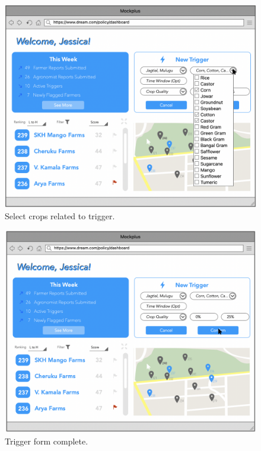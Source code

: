 \begin{figure}[H]
\centering
\includegraphics[scale=0.4]{../images_diagrams/mock_ups/dd/Trig04_Crops.png}
\caption{\label{fig:mockpolicy_selCrops}Select crops related to trigger.}
\end{figure}

\begin{figure}[H]
\centering
\includegraphics[scale=0.4]{../images_diagrams/mock_ups/dd/Trig05_SetUpDone.png}
\caption{\label{fig:mockpolicy_formComplete}Trigger form complete.}
\end{figure}

